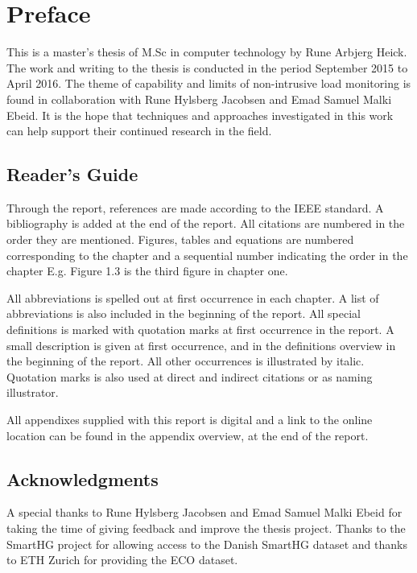 \chapter*{Preface}
This is a master's thesis of M.Sc in computer technology by Rune Arbjerg Heick. The work and writing to the thesis is conducted in the period September 2015 to April 2016. The theme of capability and limits of non-intrusive load monitoring is found in collaboration with Rune
Hylsberg Jacobsen and Emad Samuel Malki Ebeid. It is the hope that techniques and approaches investigated in this work can help support their continued research in the field.

\section*{Reader's Guide}
Through the report, references are made according to the IEEE standard. A bibliography is added at the end of the report. All citations are numbered in the order they are mentioned. Figures, tables and equations are numbered corresponding to the chapter and a sequential number indicating the order in the chapter E.g. Figure 1.3 is the third figure in chapter one.  

All abbreviations is spelled out at first occurrence in each chapter. A list of abbreviations is also included in the beginning of the report. All special definitions is marked with quotation marks at first occurrence in the report. A small description is given at first occurrence, and in the definitions overview in the beginning of the report. All other occurrences is illustrated by italic. Quotation marks is also used at direct and indirect citations or as naming illustrator. 

All appendixes supplied with this report is digital and a link to the online location can be found in the appendix overview, at the end of the report.  

\section*{Acknowledgments}
A special thanks to Rune Hylsberg Jacobsen and Emad Samuel Malki Ebeid for taking the time of giving feedback and improve the thesis project. Thanks to the SmartHG project for allowing access to the Danish SmartHG dataset and thanks to ETH Zurich for providing the ECO dataset. 